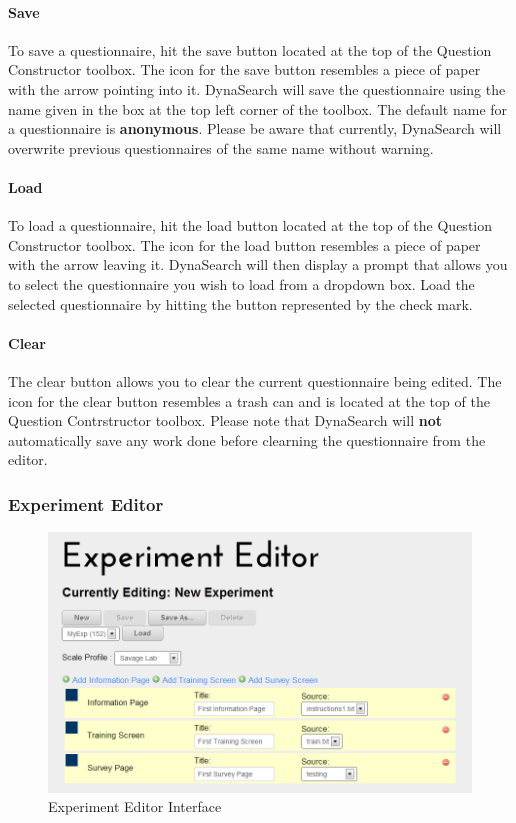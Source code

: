 \documentclass[article]{ij4uq}              %
\begin{document}
\paragraph{Save}
To save a questionnaire, hit the save button located at the top of the Question Constructor toolbox.  The icon for the save button resembles a piece of paper with the arrow pointing into it.  DynaSearch will save the questionnaire using the name given in the box at the top left corner of the toolbox.  The default name for a questionnaire is \textbf{anonymous}.  Please be aware that currently, DynaSearch will overwrite previous questionnaires of the same name without warning.

\paragraph{Load}
To load a questionnaire, hit the load button located at the top of the Question Constructor toolbox. The icon for the load button resembles a piece of paper with the arrow leaving it.  DynaSearch will then display a prompt that allows you to select the questionnaire you wish to load from a dropdown box.  Load the selected questionnaire by hitting the button represented by the check mark.

\paragraph{Clear}
The clear button allows you to clear the current questionnaire being edited.  The icon for the clear button resembles a trash can and is located at the top of the Question Contrstructor toolbox.  Please note that DynaSearch will \textbf{not} automatically save any work done before clearning the questionnaire from the editor.

\subsubsection{Experiment Editor}

\begin{figure}[h!]
 \centering
 \includegraphics[width=5.0in]{figures/experiment_editor.png}
 \caption{Experiment Editor Interface}
 \label{fig:eeInterface}
\end{figure}
\FloatBarrier
\end{document}
